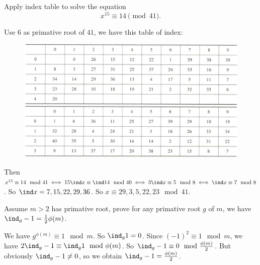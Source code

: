 \documentclass{ctexart}
\begin{document}
\begin{problem}\label{pro:3}
  Apply index table to solve the equation \[
    x^{15 } \equiv 14 \pmod{41}.
  \]
\end{problem}
\begin{solution}
  Use \(6\) as primative root of \(41\), we have this table of index:
  \begin{figure}[H]
    \centering
    \includegraphics[width=\linewidth]{./mod41.png}
  \end{figure}
  Then \(x^{15} \equiv 14 \mod 41 \iff 15 \ind x \equiv \ind 14 \mod 40 \iff 3 \ind x \equiv 5 \mod 8 \iff \ind x \equiv 7 \mod 8\).
  So \(\ind x = 7,15,22,29,36\). So \(x \equiv 29,3,5,22,23 \mod 41\).
\end{solution}
\begin{problem}\label{pro:4}
  Assume \(m >2\) has primative root, prove for any primative root \(g\) of \(m\), we have \(\ind_g -1=\frac{1}{2}\phi(m)\).
\end{problem}
\begin{solution}
  We have \(g^{\phi(m)} \equiv 1 \mod m\).
  So \(\ind_g 1=0\).
  Since \((-1)^2 \equiv 1 \mod m\), we have \(2 \ind_g -1 \equiv \ind_g 1 \mod \phi(m)\).
  So \(\ind_g -1 \equiv 0 \mod \frac{\phi(m)}{2}\).
  But obviously \(\ind_g -1 \neq 0\), so we obtain \(\ind_g -1 = \frac{\phi(m)}{2}\).
\end{solution}
\end{document}
